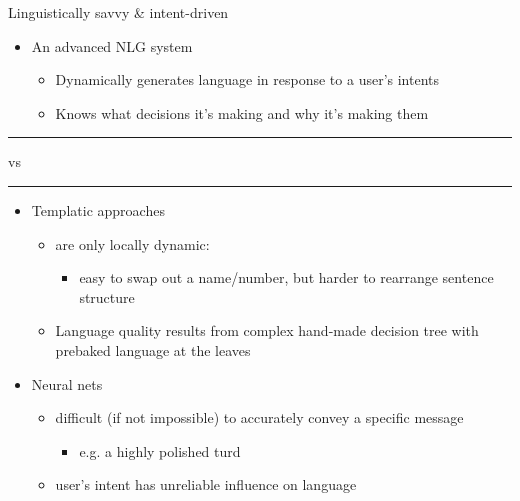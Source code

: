 \documentclass[10pt, compress]{beamer}		%
\begin{document}
\begin{frame}{Linguistically savvy \& intent-driven}
    \begin{itemize}
    	\item An advanced NLG system
            \begin{itemize}
                \item Dynamically generates language in response to a user's intents\\
                \item Knows what decisions it's making and why it's making them\\
            \end{itemize}
    \end{itemize}
    \pause
    \begin{center}
        \rule{50pt}{0.4pt} vs \rule{50pt}{0.4pt}
     \end{center}
	\begin{itemize}
		\item Templatic approaches
		\begin{itemize}
			\item are only locally dynamic:
			\begin{itemize}
				\item<3-> easy to swap out a name/number, but harder to rearrange sentence structure
			\end{itemize}
			\item Language quality results from complex hand-made decision tree with prebaked language at the leaves
		\end{itemize}

		\item Neural nets
		\begin{itemize}
			\item difficult (if not impossible) to accurately convey a specific message
			\begin{itemize}
				\item<4-> e.g. a highly polished turd
			\end{itemize}
			\item user's intent has unreliable influence on language
		\end{itemize}
	\end{itemize}
\end{frame}
\end{document}
